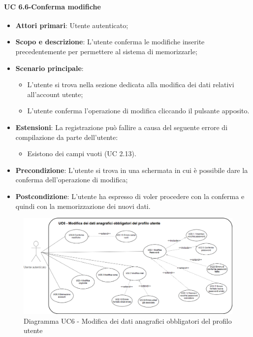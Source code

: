         \paragraph{UC 6.6-Conferma modifiche}
            \begin{itemize}
                \item \textbf{Attori primari}: Utente autenticato;
                
                \item \textbf{Scopo e descrizione}: L'utente conferma le modifiche inserite precedentemente per        permettere al sistema di memorizzarle; 
                \item \textbf{Scenario principale}:
                    \begin{itemize}
                        \item L'utente si trova nella sezione dedicata alla modifica dei dati relativi all'account utente;
                        \item L'utente conferma l'operazione di modifica cliccando il pulsante apposito.
                    \end{itemize}
                    \item \textbf{Estensioni}: La registrazione può fallire a causa del seguente errore di compilazione da parte dell'utente:
                    \begin{itemize}
                    \item Esistono dei campi vuoti (UC 2.13).
                    \end{itemize}
                \item \textbf{Precondizione}: L'utente si trova in una schermata in cui è possibile dare la conferma
                dell'operazione di modifica;
                \item \textbf{Postcondizione}: L’utente ha espresso di voler procedere con la conferma e quindi
                con la memorizzazione dei nuovi dati.
            \end{itemize}
        
   \begin{figure}[h!]
           \begin{center}
           \includegraphics[scale=0.38]{immagini/6.png}
           \caption{Diagramma UC6 - Modifica dei dati anagrafici obbligatori del profilo utente}
           \end{center}
   \end{figure}
     
